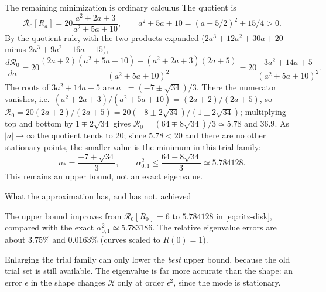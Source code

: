 \documentclass[11pt]{beamer}
\newcommand{\R}{\mathcal R}
\begin{document}
\begin{frame}{The remaining minimization is ordinary calculus}
\small
The quotient is
\[
 \R_0[R_a]=20\frac{a^2+2a+3}{a^2+5a+10},\qquad
 a^2+5a+10=(a+5/2)^2+15/4>0.
\]
By the quotient rule, with the two products expanded
($2a^3+12a^2+30a+20$ minus $2a^3+9a^2+16a+15$),
\[
 \frac{d\R_0}{da}
 =20\frac{(2a+2)(a^2+5a+10)-(a^2+2a+3)(2a+5)}{(a^2+5a+10)^2}
 =20\frac{3a^2+14a+5}{(a^2+5a+10)^2}.
\]
The roots of $3a^2+14a+5$ are $a_\pm=(-7\pm\sqrt{34})/3$. There the numerator vanishes,
i.e.\ $(a^2+2a+3)/(a^2+5a+10)=(2a+2)/(2a+5)$, so $\R_0=20(2a+2)/(2a+5)=20(-8\pm2\sqrt{34})/(1\pm2\sqrt{34})$; multiplying top and bottom
by $1\mp2\sqrt{34}$ gives $\R_0=(64\mp8\sqrt{34})/3\simeq5.78$ and $36.9$.
As $|a|\to\infty$ the quotient tends to $20$; since $5.78<20$ and there are no other
stationary points, the smaller value is the minimum in this trial family:
\begin{equation}
 a_* =\frac{-7+\sqrt{34}}3,\qquad
 \alpha_{0,1}^2\le\frac{64-8\sqrt{34}}3\simeq5.784128.
 \label{eq:ritz-disk}
\end{equation}
This remains an upper bound, not an exact eigenvalue.
\end{frame}

\begin{frame}{What the approximation has, and has not, achieved}
\small
\begin{center}
\end{center}
The upper bound improves from $\R_0[R_0]=6$ to $5.784128$ in \eqref{eq:ritz-disk}, compared with the exact $\alpha_{0,1}^2\simeq5.783186$.
The relative eigenvalue errors are about $3.75\%$ and $0.0163\%$ (curves scaled to $R(0)=1$).

\medskip
Enlarging the trial family can only lower the \emph{best} upper bound,
because the old trial set is still available. The eigenvalue is far more accurate than the
shape: an error $\epsilon$ in the shape changes $\R$ only at order $\epsilon^2$,
since the mode is stationary.
\end{frame}
\end{document}

